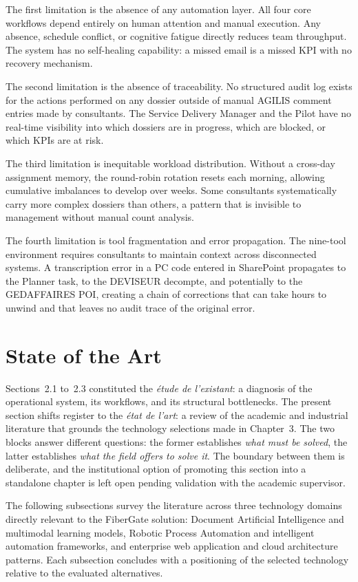 The first limitation is the absence of any automation layer. All four core workflows depend entirely on human attention and manual execution. Any absence, schedule conflict, or cognitive fatigue directly reduces team throughput. The system has no self-healing capability: a missed email is a missed KPI with no recovery mechanism.

The second limitation is the absence of traceability. No structured audit log exists for the actions performed on any dossier outside of manual AGILIS comment entries made by consultants. The Service Delivery Manager and the Pilot have no real-time visibility into which dossiers are in progress, which are blocked, or which KPIs are at risk.

The third limitation is inequitable workload distribution. Without a cross-day assignment memory, the round-robin rotation resets each morning, allowing cumulative imbalances to develop over weeks. Some consultants systematically carry more complex dossiers than others, a pattern that is invisible to management without manual count analysis.

The fourth limitation is tool fragmentation and error propagation. The nine-tool environment requires consultants to maintain context across disconnected systems. A transcription error in a PC code entered in SharePoint propagates to the Planner task, to the DEVISEUR decompte, and potentially to the GEDAFFAIRES POI, creating a chain of corrections that can take hours to unwind and that leaves no audit trace of the original error.

\section{State of the Art}

Sections~2.1 to~2.3 constituted the \textit{étude de l'existant}: a diagnosis of the operational system, its workflows, and its structural bottlenecks. The present section shifts register to the \textit{état de l'art}: a review of the academic and industrial literature that grounds the technology selections made in Chapter~3. The two blocks answer different questions: the former establishes \emph{what must be solved}, the latter establishes \emph{what the field offers to solve it}. The boundary between them is deliberate, and the institutional option of promoting this section into a standalone chapter is left open pending validation with the academic supervisor.

The following subsections survey the literature across three technology domains directly relevant to the FiberGate solution: Document Artificial Intelligence and multimodal learning models, Robotic Process Automation and intelligent automation frameworks, and enterprise web application and cloud architecture patterns. Each subsection concludes with a positioning of the selected technology relative to the evaluated alternatives.

